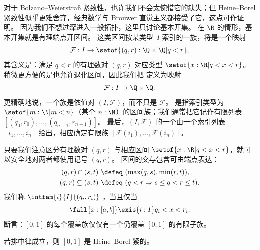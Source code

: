 对于 Bolzano--Weierstra\ss{} 紧致性，也许我们不会太惋惜它的缺失；但 Heine--Borel 紧致性似乎更难舍弃，经典数学与 Brouwer 直觉主义都接受了它，这点可作证明。
因为我们不想过深进入一般拓扑，这里只讨论基本开集。
在 $\R$ 的情形，基本开集就是有理端点开区间。
这类区间按某类型~$I$ 索引的一族，将是一个映射
%
\begin{equation*}
  \mathcal{F} : I \to \setof{(q, r) : \Q \times \Q | q < r},
\end{equation*}
%
其含义是：满足 $q < r$ 的有理数对 $(q, r)$ 对应类型 $\setof{ x : \R | q < x < r}$。
稍微更方便的是也允许退化区间，因此我们把
%
%
定义为映射
%
\begin{equation*}
  \mathcal{F} : I \to \Q \times \Q.
\end{equation*}
%
更精确地说，一个族是依值对 $(I, \mathcal{F})$，而不只是
$\mathcal{F}$。
是指索引类型为 $\setof{ m :
  \N | m < n}$（某个 $n : \N$）的区间族；我们通常把它记作有限列表 $[(q_0, r_0), \ldots,
(q_{n-1}, r_{n-1})]$。
最后，$(I, \mathcal{F})$ 的一个由一个索引列表 $[i_1, \ldots, i_n]$ 给出，相应确定有限族
$[\mathcal{F}(i_1), \ldots, \mathcal{F}(i_n)]$。

只要我们注意区分有理数对 $(q, r)$ 与相应区间 $\setof{ x : \R | q < x < r}$，就可以安全地对两者都使用记号 $(q, r)$。
区间的交与包含可由端点表达：
%
\begin{align*}
  (q, r) \cap (s, t) &\ \defeq\  (\max(q, s), \min(r, t)),\\
  (q, r) \subseteq (s, t) &\ \defeq\ (q < r \Rightarrow s \leq q < r \leq t).
\end{align*}
%
我们称 $\intfam{i}{I}{(q_i, r_i)}$
%
%
%
，当且仅当
%
\begin{equation} \label{eq:cover-pointwise-truncated}
  \fall{x : [a,b]} \exis{i : I} q_i < x < r_i.
\end{equation}
%
%
断言：$[0,1]$ 的每个覆盖族仅仅有一个仍覆盖 $[0,1]$ 的有限子族。

\begin{thm} \label{classical-Heine-Borel}
  若排中律成立，则 $[0,1]$ 是 Heine--Borel 紧的。
\end{thm}

